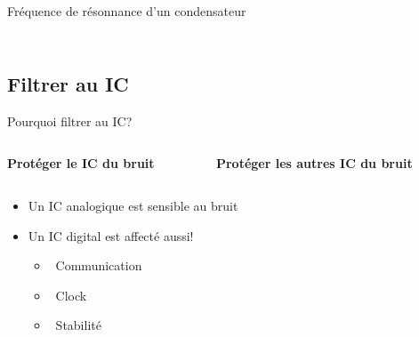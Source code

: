 \begin{frame}{Fréquence de résonnance d'un condensateur}
\begin{columns}
\begin{column}{0.5\textwidth}
\begin{figure}
            \end{figure}
        \end{column}
    \end{columns}
\end{frame}


\subsection{Filtrer au IC}

\begin{frame}{Pourquoi filtrer au IC?}
    \vspace{-6pt}
    \begin{columns}
        \begin{column}{0.5\textwidth}
            \begin{center}
                \textbf{Protéger le IC du bruit}
            \end{center}
        \end{column}
        \begin{column}{0.5\textwidth}
            \begin{center}
                \textbf{Protéger les autres IC du bruit}
            \end{center}
        \end{column}
    \end{columns}
    \begin{columns}
        \begin{column}{0.5\textwidth}
            \begin{itemize}
                \item Un IC analogique est sensible au bruit
                \item Un IC digital est affecté aussi!
                \begin{itemize}
                    \item[] \textcolor{UDSgreenFierte}{\faNetworkWired} 
                        ~Communication
                    \item[] \textcolor{UDSgreenFierte}{\faWaveSquare} 
                        ~Clock
                    \item[] \textcolor{UDSgreenFierte}{\faBalanceScale} 
                        ~Stabilité
                \end{itemize}
            \end{itemize}
        \end{column}
        \begin{column}{0.5\textwidth}

\end{column}
\end{columns}
\end{frame}
